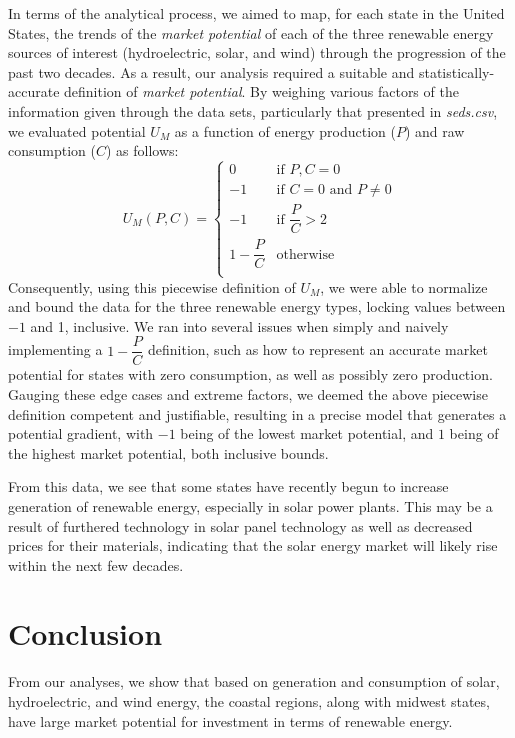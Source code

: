 \documentclass[12pt]{article}
\begin{document}
In terms of the analytical process, we aimed to map, for each state in the United States, the trends of the \textit{market potential} of each of the three renewable energy sources of interest (hydroelectric, solar, and wind) through the progression of the past two decades. As a result, our analysis required a suitable and statistically-accurate definition of \textit{market potential}. By weighing various factors of the information given through the data sets, particularly that presented in \textit{seds.csv}, we evaluated potential $U_M$ as a function of energy production ($P$) and raw consumption ($C$) as follows:
\[
  U_M(P, C) =
  \begin{cases}
    0 & \text{if $P,C=0$} \\
    -1 & \text{if $C=0$ and $P\neq0$} \\
    -1 & \text{if $\dfrac{P}{C}>2$} \\
    1-\dfrac{P}{C} & \text{otherwise} \\
  \end{cases}
\]
Consequently, using this piecewise definition of $U_M$, we were able to normalize and bound the data for the three renewable energy types, locking values between $-1$ and 1, inclusive. We ran into several issues when simply and naively implementing a $1-\dfrac{P}{C}$ definition, such as how to represent an accurate market potential for states with zero consumption, as well as possibly zero production. Gauging these edge cases and extreme factors, we deemed the above piecewise definition competent and justifiable, resulting in a precise model that generates a potential gradient, with $-1$ being of the lowest market potential, and $1$ being of the highest market potential, both inclusive bounds.

From this data, we see that some states have recently begun to increase generation of renewable energy, especially in solar power plants. This may be a result of furthered technology in solar panel technology as well as decreased prices for their materials, indicating that the solar energy market will likely rise within the next few decades. 
\newpage

\section{Conclusion}
From our analyses, we show that based on generation and consumption of solar, hydroelectric, and wind energy, the coastal regions, along with midwest states, have large market potential for investment in terms of renewable energy.
\end{document}
